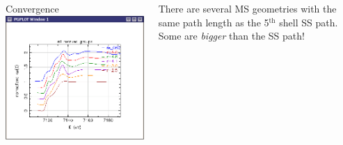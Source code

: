 \documentclass[10pt, xcolor=x11names, compress]{beamer}
\newcommand{\pto}{PbTiO$_3$}
\begin{document}
\begin{frame}
  \medskip
  
  \begin{columns}
    \begin{column}{0.4\linewidth}
      \begin{block}{Convergence}
        \includegraphics[width=\linewidth]{images/xanes_convergence}
      \end{block}
    \end{column}
    \begin{column}{0.6\linewidth}
      There are several MS geometries with the same path length as the
      5$^{\mathrm{th}}$ shell SS path.  Some are \emph{bigger} than
      the SS path!
    \end{column}
  \end{columns}
\end{frame}



% 
% 
\end{document}
